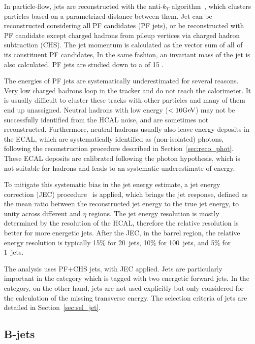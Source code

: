 In particle-flow, jets are reconstructed with the anti-$k_{T}$ algorithm~\cite{Cacciari_2008, fastjet},
which clusters particles based on a parametrized distance between them.
Jet can be reconstructed considering all PF candidates (PF jets), 
or be reconstructed with PF candidate except charged hadrons from pileup vertices via charged hadron subtraction (CHS). 
The jet momentum is calculated as the vector sum of all of its constituent PF candidates, 
In the same fashion, an invariant mass of the jet is also calculated. 
PF jets are studied down to a \pt of 15 \GeV.

The energies of PF jets are systematically underestimated for several reasons.
Very low \pt charged hadrons loop in the tracker and do not reach the calorimeter.
It is usually difficult to cluster these tracks with other particles and many of them end up unassigned.
Neutral hadrons with low energy ($< 10 \mbox{GeV}$) may not be successfully identified from the HCAL noise, and are sometimes not reconstructed.
Furthermore, neutral hadrons usually also leave energy deposits in the ECAL, 
which are systematically identified as (non-isolated) photons,
following the reconstruction procedure described in Section~\ref{sec:reco_phot}.
These ECAL deposits are calibrated following the photon hypothesis, 
which is not suitable for hadrons and leads to an systematic underestimate of energy.

To mitigate this systematic bias in the jet energy estimate, 
a jet energy correction (JEC) procedure~\cite{Khachatryan_2017} is applied,
which brings the jet response, defined as the mean ratio between the reconstructed jet energy to the true jet energy,
to unity across different \pt and $\eta$ regions.
The jet energy resolution is mostly determined by the resolution of the HCAL, 
therefore the relative resolution is better for more energetic jets.
After the JEC, in the barrel region, the relative energy resolution is typically 15\% for 20~\GeV jets,
10\% for 100~\GeV jets, and 5\% for 1~\TeV jets. 

The \hmm analysis uses PF+CHS jets, with JEC applied.
Jets are particularly important in the \qqH category which is tagged with two energetic forward jets.
In the \VH category, on the other hand, jets are not used explicitly but only considered for the calculation of the missing transverse energy. 
The selection criteria of jets are detailed in Section~\ref{sec:sel_jet}.

\subsection{B-jets}\label{sec:reco_btag}

